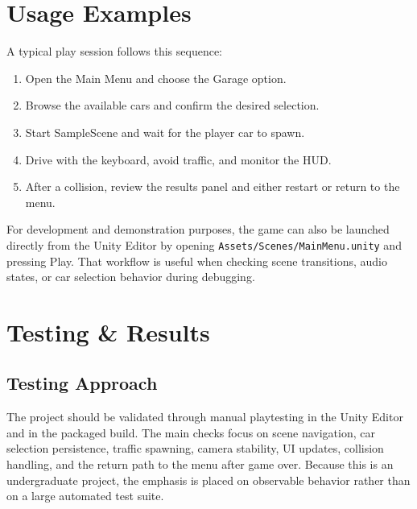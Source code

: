 \documentclass[12pt,a4paper]{article}
\begin{document}
\section{Usage Examples}
A typical play session follows this sequence:
\begin{enumerate}
    \item Open the Main Menu and choose the Garage option.
    \item Browse the available cars and confirm the desired selection.
    \item Start SampleScene and wait for the player car to spawn.
    \item Drive with the keyboard, avoid traffic, and monitor the HUD.
    \item After a collision, review the results panel and either restart or return to the menu.
\end{enumerate}

For development and demonstration purposes, the game can also be launched directly from the Unity Editor by opening \texttt{Assets/Scenes/MainMenu.unity} and pressing Play. That workflow is useful when checking scene transitions, audio states, or car selection behavior during debugging.

\section{Testing \& Results}
\subsection{Testing Approach}
The project should be validated through manual playtesting in the Unity Editor and in the packaged build. The main checks focus on scene navigation, car selection persistence, traffic spawning, camera stability, UI updates, collision handling, and the return path to the menu after game over. Because this is an undergraduate project, the emphasis is placed on observable behavior rather than on a large automated test suite.
\end{document}

